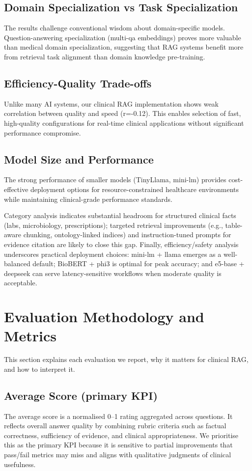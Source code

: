 \subsection{Domain Specialization vs Task Specialization}
The results challenge conventional wisdom about domain-specific models. Question-answering specialization (multi-qa embeddings) proves more valuable than medical domain specialization, suggesting that RAG systems benefit more from retrieval task alignment than domain knowledge pre-training.

\subsection{Efficiency-Quality Trade-offs}
Unlike many AI systems, our clinical RAG implementation shows weak correlation between quality and speed (r=-0.12). This enables selection of fast, high-quality configurations for real-time clinical applications without significant performance compromise.

\subsection{Model Size and Performance}
The strong performance of smaller models (TinyLlama, mini-lm) provides cost-effective deployment options for resource-constrained healthcare environments while maintaining clinical-grade performance standards.

Category analysis indicates substantial headroom for structured clinical facts (labs, microbiology, prescriptions); targeted retrieval improvements (e.g., table-aware chunking, ontology-linked indices) and instruction-tuned prompts for evidence citation are likely to close this gap. Finally, efficiency/safety analysis underscores practical deployment choices: mini-lm + llama emerges as a well-balanced default; BioBERT + phi3 is optimal for peak accuracy; and e5-base + deepseek can serve latency-sensitive workflows when moderate quality is acceptable.

\section{Evaluation Methodology and Metrics}
This section explains each evaluation we report, why it matters for clinical RAG, and how to interpret it.

\subsection{Average Score (primary KPI)}
The average score is a normalised 0--1 rating aggregated across questions. It reflects overall answer quality by combining rubric criteria such as factual correctness, sufficiency of evidence, and clinical appropriateness. We prioritise this as the primary KPI because it is sensitive to partial improvements that pass/fail metrics may miss and aligns with qualitative judgments of clinical usefulness.

